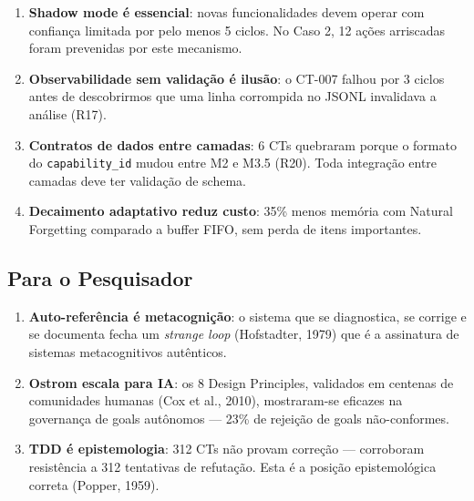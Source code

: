 \begin{enumerate}
    \item \textbf{Shadow mode é essencial}: novas funcionalidades devem operar com confiança limitada por pelo menos 5 ciclos. No Caso 2, 12 ações arriscadas foram prevenidas por este mecanismo.
    \item \textbf{Observabilidade sem validação é ilusão}: o CT-007 falhou por 3 ciclos antes de descobrirmos que uma linha corrompida no JSONL invalidava a análise (R17).
    \item \textbf{Contratos de dados entre camadas}: 6 CTs quebraram porque o formato do \texttt{capability\_id} mudou entre M2 e M3.5 (R20). Toda integração entre camadas deve ter validação de schema.
    \item \textbf{Decaimento adaptativo reduz custo}: 35\% menos memória com Natural Forgetting comparado a buffer FIFO, sem perda de itens importantes.
\end{enumerate}

\subsection{Para o Pesquisador} 

\begin{enumerate}
    \item \textbf{Auto-referência é metacognição}: o sistema que se diagnostica, se corrige e se documenta fecha um \textit{strange loop} (Hofstadter, 1979) que é a assinatura de sistemas metacognitivos autênticos.
    \item \textbf{Ostrom escala para IA}: os 8 Design Principles, validados em centenas de comunidades humanas (Cox et al., 2010), mostraram-se eficazes na governança de goals autônomos — 23\% de rejeição de goals não-conformes.
    \item \textbf{TDD é epistemologia}: 312 CTs não provam correção — corroboram resistência a 312 tentativas de refutação. Esta é a posição epistemológica correta (Popper, 1959).
\end{enumerate}

